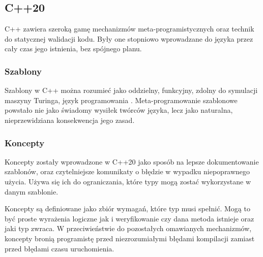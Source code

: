\subsection{C++20}
C++ zawiera szeroką gamę mechanizmów meta-programistycznych oraz technik do statycznej walidacji kodu. Były one stopniowo wprowadzane do języka przez cały czas jego istnienia, bez spójnego planu.\par
\subsubsection{Szablony}
Szablony w C++ można rozumieć jako oddzielny, funkcyjny, zdolny do symulacji maszyny Turinga, język programowania \cite{template_turing_complete}. Meta-programowanie szablonowe powstało nie jako świadomy wysiłek twórców języka, lecz jako naturalna, nieprzewidziana konsekwencja jego zasad.\par
\subsubsection{Koncepty}
Koncepty zostały wprowadzone w C++20 jako sposób na lepsze dokumentowanie szablonów, oraz czytelniejsze komunikaty o błędzie w wypadku niepoprawnego użycia. Używa się ich do ograniczania, które typy mogą zostać wykorzystane w danym szablonie.\par
Koncepty są definiowane jako zbiór wymagań, które typ musi spełnić. Mogą to być proste wyrażenia logiczne jak i weryfikowanie czy dana metoda istnieje oraz jaki typ zwraca. W przeciwieństwie do pozostałych omawianych mechanizmów, koncepty bronią programistę przed niezrozumiałymi błędami kompilacji zamiast przed błędami czasu uruchomienia.\par
